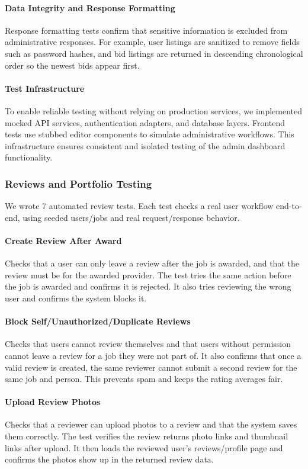 \documentclass[11pt]{article}
\begin{document}
\paragraph{Data Integrity and Response Formatting}
Response formatting tests confirm that sensitive information is excluded from administrative responses. For example, user listings are sanitized to remove fields such as password hashes, and bid listings are returned in descending chronological order so the newest bids appear first.

\paragraph{Test Infrastructure}
To enable reliable testing without relying on production services, we implemented mocked API services, authentication adapters, and database layers. Frontend tests use stubbed editor components to simulate administrative workflows. This infrastructure ensures consistent and isolated testing of the admin dashboard functionality.

\subsubsection{Reviews and Portfolio Testing}
We wrote 7 automated review tests. Each test checks a real user workflow end-to-end, using seeded users/jobs and real request/response behavior.

\paragraph{Create Review After Award}
Checks that a user can only leave a review after the job is awarded, and that the review must be for the awarded provider. The test tries the same action before the job is awarded and confirms it is rejected. It also tries reviewing the wrong user and confirms the system blocks it.

\paragraph{Block Self/Unauthorized/Duplicate Reviews}
Checks that users cannot review themselves and that users without permission cannot leave a review for a job they were not part of. It also confirms that once a valid review is created, the same reviewer cannot submit a second review for the same job and person. This prevents spam and keeps the rating averages fair.

\paragraph{Upload Review Photos}
Checks that a reviewer can upload photos to a review and that the system saves them correctly. The test verifies the review returns photo links and thumbnail links after upload. It then loads the reviewed user's reviews/profile page and confirms the photos show up in the returned review data.
\end{document}
